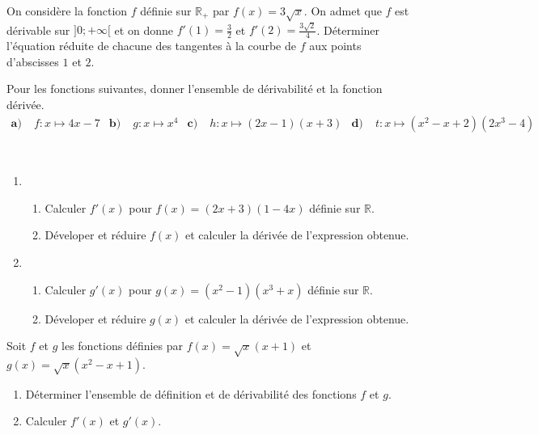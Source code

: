 \documentclass[11pt]{article}
\begin{document}
\begin{exo}
On considère la fonction $f$ définie sur
$\mathbb{R}_+$ par $f(x)=3\sqrt x$. On admet que $f$ est dérivable sur $]0;
+\infty[$ et on donne $f'(1)=\frac{3}{2}$ et $f'(2)=\frac{3\sqrt{2}}{4}$.
Déterminer l'équation réduite de chacune des tangentes à la courbe de $f$ aux
points d'abscisses $1$ et $2$.
\end{exo}

\begin{exo}
Pour les fonctions suivantes, donner l'ensemble de
dérivabilité et la fonction dérivée.
\begin{align*}
  \textbf{a)}\;& f:x\mapsto 4x-7 &
  \textbf{b)}\;& g:x\mapsto x^4 &
  \textbf{c)}\;& h:x\mapsto (2x-1)(x+3) &
  \textbf{d)}\;& t:x\mapsto (x^2-x+2)(2x^3-4)
\end{align*}
\end{exo}

\begin{exo}~
\begin{enumerate}
  \item \begin{enumerate}
      \item Calculer $f'(x)$ pour $f(x)=(2x+3)(1-4x)$ définie sur $\mathbb{R}$.
      \item Déveloper et réduire $f(x)$ et calculer la dérivée de l'expression
        obtenue.
    \end{enumerate}
  \item \begin{enumerate}
      \item Calculer $g'(x)$ pour $g(x)=(x^2-1)(x^3+x)$ définie sur
        $\mathbb{R}$.
      \item Déveloper et réduire $g(x)$ et calculer la dérivée de l'expression
        obtenue.
    \end{enumerate}
\end{enumerate}
\end{exo}

\begin{exo}
Soit $f$ et $g$ les fonctions définies par $f(x)=\sqrt
x(x+1)$ et $g(x)=\sqrt x(x^2-x+1)$.
\begin{enumerate}
  \item Déterminer l'ensemble de définition et de dérivabilité des fonctions $f$
    et $g$.
  \item Calculer $f'(x)$ et $g'(x)$.
\end{enumerate}
\end{exo}
\end{document}
